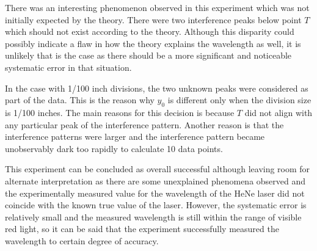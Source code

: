 \documentclass{article}
\begin{document}
There was an interesting phenomenon observed in this experiment which was not initially expected by the theory. There were two interference peaks below point $T$ which should not exist according to the theory. Although this disparity could possibly indicate a flaw in how the theory explains the wavelength as well, it is unlikely that is the case as there should be a more significant and noticeable systematic error in that situation.

In the case with 1/100 inch divisions, the two unknown peaks were considered as part of the data. This is the reason why $y_0$ is different only when the division size is 1/100 inches. The main reasons for this decision is because $T$ did not align with any particular peak of the interference pattern. Another reason is that the interference patterns were larger and the interference pattern became unobservably dark too rapidly to calculate 10 data points.

This experiment can be concluded as overall successful although leaving room for alternate interpretation as there are some unexplained phenomena observed and the experimentally measured value for the wavelength of the HeNe laser did not coincide with the known true value of the laser. However, the systematic error is relatively small and the measured wavelength is still within the range of visible red light, so it can be said that the experiment successfully measured the wavelength to certain degree of accuracy.

\printbibliography
\end{document}
